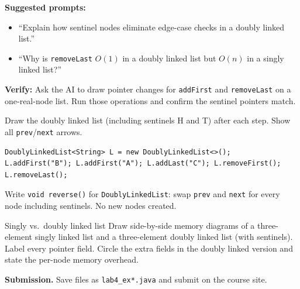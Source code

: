 \documentclass[11pt]{article}
\begin{document}
\begin{aicollab}
\textbf{Suggested prompts:}
\begin{itemize}[leftmargin=*,nosep]
  \item ``Explain how sentinel nodes eliminate edge-case checks in a doubly linked list.''
  \item ``Why is \texttt{removeLast} $O(1)$ in a doubly linked list but $O(n)$ in a singly linked list?''
\end{itemize}
\medskip\textbf{Verify:} Ask the AI to draw pointer changes for \texttt{addFirst} and \texttt{removeLast}
on a one-real-node list. Run those operations and confirm the sentinel pointers match.
\end{aicollab}

\takehomebanner

\begin{trace}
Draw the doubly linked list (including sentinels H and T) after each step.
Show all \texttt{prev}/\texttt{next} arrows.
\begin{lstlisting}
DoublyLinkedList<String> L = new DoublyLinkedList<>();
L.addFirst("B"); L.addFirst("A"); L.addLast("C"); L.removeFirst(); L.removeLast();
\end{lstlisting}
\end{trace}

\begin{writecode}
Write \texttt{void reverse()} for \texttt{DoublyLinkedList}: swap \texttt{prev} and \texttt{next}
for every node including sentinels. No new nodes created.
\end{writecode}

\begin{drawex}{Singly vs.\ doubly linked list}
Draw side-by-side memory diagrams of a three-element singly linked list and a
three-element doubly linked list (with sentinels). Label every pointer field.
Circle the extra fields in the doubly linked version and state the per-node memory overhead.
\end{drawex}

\vspace{4pt}
\noindent\textbf{Submission.} Save files as \texttt{lab4\_ex*.java} and submit on the course site.
\end{document}
